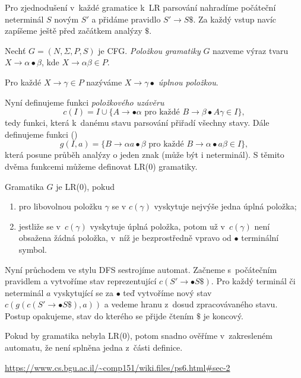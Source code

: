 Pro zjednodušení v~každé gramatice k~LR parsování nahradíme počáteční
neterminál $S$ novým $S'$ a přidáme pravidlo $S' \to S\$$. Za každý
vstup navíc zapíšeme ještě před začátkem analýzy $\$$.

\begin{definition}
    Nechť $G = (N, \Sigma, P, S)$ je CFG.
    {\em Položkou gramatiky} $G$ nazveme výraz tvaru
    $X \to \alpha \bullet \beta$, kde $X \to \alpha \beta \in P$.

    Pro každé $X \to \gamma \in P$ nazýváme $X \to \gamma \bullet$
    {\em úplnou položkou}.
\end{definition}

Nyní definujeme funkci {\em položkového uzávěru}
\[
    c(I) = I \cup
    \{ A \to \bullet \alpha \text{ pro každé } B \to \beta \bullet A \gamma \in I \},
\]
tedy funkci, která k~danému stavu parsování přiřadí všechny
 stavy. Dále definujeme funkci ()
\[
g(I, a) = \{ B \to \alpha a \bullet \beta \text{ pro každé }
    B \to \alpha \bullet a \beta \in I \},
\]
která posune průběh analýzy o jeden znak (může být i neterminál).
S těmito dvěma funkcemi můžeme definovat LR(0) gramatiky.

\begin{definition}
    Gramatika $G$ je LR(0), pokud
    \begin{enumerate}
        \item pro libovolnou položku $\gamma$ se v $c(\gamma)$ vyskytuje
            nejvýše jedna úplná položka;
        \item jestliže se v~$c(\gamma)$ vyskytuje úplná položka, potom
            už v~$c(\gamma)$ není obsažena žádná položka, v~níž
            je bezprostředně vpravo od $\bullet$ terminální symbol.
    \end{enumerate}
\end{definition}

Nyní průchodem ve stylu DFS sestrojíme automat. Začneme s~počátečním
pravidlem a vytvoříme stav reprezentující $c(S' \to \bullet S\$)$.
Pro každý terminál či neterminál $a$ vyskytující se
za $\bullet$ teď vytvoříme nový stav $c(g(c(S' \to \bullet S\$), a))$
a vedeme hranu z~dosud zpracovávaného stavu.
Postup opakujeme, stav do kterého se přijde čtením $\$$ je koncový.

Pokud by gramatika nebyla LR(0), potom snadno ověříme v~zakresleném
automatu, že není splněna jedna z~části definice.

\begin{example}
    \href{https://www.cs.bgu.ac.il/~comp151/wiki.files/ps6.html\#sec-2}
{https://www.cs.bgu.ac.il/{\textasciitilde}comp151/wiki.files/ps6.html\#sec-2}
\end{example}


